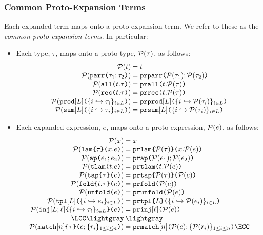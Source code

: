 \subsubsection{Common Proto-Expansion Terms} Each expanded term maps onto a proto-expansion term. We refer to these as the \emph{common proto-expansion terms}. In particular:
\begin{itemize}
  \item Each type, $\tau$, maps onto a proto-type, $\mathcal{P}(\tau)$, as follows:
  \[\arraycolsep=1pt\begin{array}{rl}
  \Cof{t} & = t\\
  \Cof{\aparr{\tau_1}{\tau_2}} & = \aceparr{\Cof{\tau_1}}{\Cof{\tau_2}}\\
  \Cof{\aall{t}{\tau}} & = \aceall{t}{\Cof{\tau}}\\
  \Cof{\arec{t}{\tau}} & = \acerec{t}{\Cof{\tau}}\\
  \Cof{\aprod{\labelset}{\mapschema{\tau}{i}{\labelset}}} & = \aceprod{\labelset}{\mapschemax{\Cofv}{\tau}{i}{\labelset}}\\
  \Cof{\asum{\labelset}{\mapschema{\tau}{i}{\labelset}}} & = \acesum{\labelset}{\mapschemax{\Cofv}{\tau}{i}{\labelset}}
  \end{array}\]
  \item Each expanded expression, $e$, maps onto a proto-expression, $\mathcal{P}(e)$, as follows:
  \[\arraycolsep=1pt\begin{array}{rl}
  \Cof{x} & = x\\
  \Cof{\aelam{\tau}{x}{e}} & = \acelam{\Cof{\tau}}{x}{\Cof{e}}\\
  \Cof{\aeap{e_1}{e_2}} & = \aceap{\Cof{e_1}}{\Cof{e_2}}\\
  \Cof{\aetlam{t}{e}} & = \acetlam{t}{\Cof{e}}\\
  \Cof{\aetap{e}{\tau}} & = \acetap{\Cof{e}}{\Cof{\tau}}\\
  \Cof{\aefold{t}{\tau}{e}} & = \acefold{\Cof e}\\
  \Cof{\aeunfold{e}} & = \aceunfold{\Cof{e}}\\
  \Cof{\aetpl{\labelset}{\mapschema{e}{i}{\labelset}}} & = \acetpl{\labelset}{\mapschemax{\Cofv}{e}{i}{\labelset}}\\
  \Cof{\aein{\labelset}{\ell}{\mapschema{\tau}{i}{\labelset}}{e}} &= \acein{\ell}{\Cof{e}}\\
  \LCC \lightgray & \lightgray \\
  \Cof{\aematchwith{n}{\tau}{e}{\seqschemaX{r}}} & = \acematchwith{n}{\Cof{e}}{\seqschemaXx{\Cofv}{r}} \ECC
  \end{array}\]
  \end{itemize}
